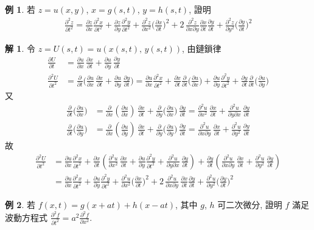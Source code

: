\documentclass[12pt]{extarticle}
\newcommand{\ds}{\displaystyle}
\theoremstyle{definition}
\newtheorem*{ex}{例}
\newtheorem*{sol}{解}
\newcommand{\pdiff}[2]{\frac{\partial #1}{\partial #2}}
\newcommand{\pdifft}[2]{\frac{\partial^2 #1}{\partial #2^2}}
\begin{document}
\begin{ex}
  若 $\ds z = u(x, y)$, $\ds x = g(s, t)$, $\ds y = h(s, t)$, 證明 
  \begin{align*}
    \pdifft{z}{t} = \pdiff{z}{x}\pdifft{x}{t} + \pdiff{z}{y}\pdifft{y}{t} + \pdifft{z}{x}\bigg(\pdiff{x}{t}\bigg)^2 + 2\,\frac{\partial^2 z}{\partial x\partial y}\pdiff{x}{t}\pdiff{y}{t} + \pdifft{z}{y}\bigg(\pdiff{y}{t}\bigg)^2
  \end{align*}
\end{ex}

\begin{sol}
  令 $\ds z = U(s, t) = u(x(s, t),\,y(s, t))$, 由鏈鎖律 
  \begin{align*}
    \pdiff{U}{t} &= \pdiff{u}{x}\,\pdiff{x}{t} + \pdiff{u}{y}\,\pdiff{y}{t} \\
    \pdifft{U}{t} &= \pdiff{}{t}\bigg(\pdiff{u}{x}\,\pdiff{x}{t} + \pdiff{u}{y}\,\pdiff{y}{t}\bigg) = \pdiff{u}{x}\pdifft{x}{t} + \pdiff{x}{t}\pdiff{}{t}\bigg(\pdiff{u}{x}\bigg) + \pdiff{u}{y}\pdifft{y}{t} + \pdiff{y}{t}\pdiff{}{t}\bigg(\pdiff{u}{y}\bigg) 
  \end{align*}
  又
  \begin{align*}
    \pdiff{}{t}\bigg(\pdiff{u}{x}\bigg) &= \pdiff{}{x}\left(\pdiff{u}{x}\right)\,\pdiff{x}{t} + \pdiff{}{y}\bigg(\pdiff{u}{x}\bigg)\,\pdiff{y}{t} = \pdifft{u}{x}\,\pdiff{x}{t} + \frac{\partial^2 u}{\partial y\partial x}\,\pdiff{y}{t}\\
    \pdiff{}{t}\bigg(\pdiff{u}{y}\bigg) &= \pdiff{}{x}\left(\pdiff{u}{y}\right)\,\pdiff{x}{t} + \pdiff{}{y}\bigg(\pdiff{u}{y}\bigg)\,\pdiff{y}{t} = \frac{\partial^2 u}{\partial x\partial y}\,\pdiff{x}{t} + \pdifft{u}{y}\,\pdiff{y}{t}
  \end{align*}
  故
  \begin{align*}
    \pdifft{U}{t} &= \pdiff{u}{x}\pdifft{x}{t} + \pdiff{x}{t}\left(\pdifft{u}{x}\,\pdiff{x}{t} + \pdiff{u}{y}\pdifft{y}{t} + \frac{\partial^2 u}{\partial y\partial x}\,\pdiff{y}{t}\right) + \pdiff{y}{t}\left(\frac{\partial^2 u}{\partial x\partial y}\,\pdiff{x}{t} + \pdifft{u}{y}\,\pdiff{y}{t}\right) \\ &= \pdiff{u}{x}\pdifft{x}{t} + \pdiff{u}{y}\pdifft{y}{t} + \pdifft{u}{x}\bigg(\pdiff{x}{t}\bigg)^2 + 2\,\frac{\partial^2 u}{\partial x\partial y}\,\pdiff{x}{t}\pdiff{y}{t} + \pdifft{u}{y}\bigg(\pdiff{y}{t}\bigg)^2
  \end{align*}
\end{sol}

\begin{ex} 若 $\ds f(x, t) = g(x + at) + h(x - at)$, 其中 $g$, $h$ 可二次微分, 證明 $f$ 滿足波動方程式 $\ds\pdifft{f}{t} = a^2\pdifft{f}{x}$. 
\end{ex}
\end{document}
